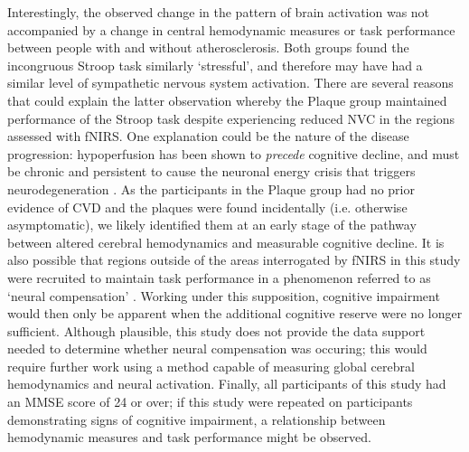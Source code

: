 \documentclass[12pt]{spieman}  %
\begin{document}
\begin{spacing}{2}
Interestingly, the observed  change in the pattern of brain activation was not accompanied by a change in central hemodynamic measures or task performance between people with and without atherosclerosis. Both groups found the incongruous Stroop task similarly `stressful', and therefore may have had a similar level of sympathetic nervous system activation. There are several reasons that could explain the latter observation whereby the Plaque group maintained performance of the Stroop task despite experiencing reduced NVC in the regions assessed with fNIRS. One explanation could be the nature of the disease progression: hypoperfusion has been shown to \textit{precede} cognitive decline, and must be chronic and persistent to cause the neuronal energy crisis that triggers neurodegeneration \cite{DelaTorre2018, Honjo2012}. As the participants in the Plaque group had no prior evidence of CVD and the plaques were found incidentally (i.e. otherwise asymptomatic), we likely identified them at an early stage of the pathway between altered cerebral hemodynamics and measurable cognitive decline. It is also possible that regions outside of the areas interrogated by fNIRS in this study were recruited to maintain task performance in a phenomenon referred to as `neural compensation'  \cite{Braskie2010, Bondi2005, Wishart2006}. Working under this supposition, cognitive impairment would then only be apparent when the additional cognitive reserve were no longer sufficient. Although plausible, this study does not provide the data support needed to determine whether neural compensation was occuring; this would require further work using a method capable of measuring global cerebral hemodynamics and neural activation. Finally, all participants of this study had an MMSE score of 24 or over; if this study were repeated on participants demonstrating signs of cognitive impairment, a relationship between hemodynamic measures and task performance might be observed.


\end{spacing}
\end{document}
